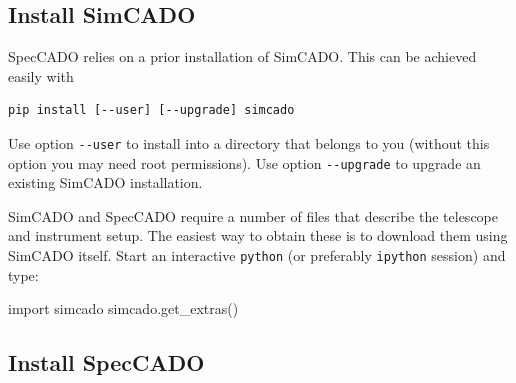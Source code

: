 \documentclass[a4paper,twoside,11pt]{article}
\begin{document}
\subsection{Install SimCADO}
\label{ssec:install_simcado}

SpecCADO relies on a prior installation of SimCADO. This can be
achieved easily with
\begin{lstlisting}[style=csh]
pip install [--user] [--upgrade] simcado
\end{lstlisting}
Use option \lstinline{--user} to install into a directory that belongs
to you (without this option you may need root permissions). Use
option \lstinline{--upgrade} to upgrade an existing SimCADO installation.

SimCADO and SpecCADO require a number of files that describe the
telescope and instrument setup. The easiest way to obtain these is to
download them using SimCADO itself. Start an interactive
\lstinline{python} (or preferably \lstinline{ipython} session) and
type:
\begin{pyin}
import simcado
simcado.get_extras()
\end{pyin}



\subsection{Install SpecCADO}
\label{ssec:install_speccado}
\end{document}

